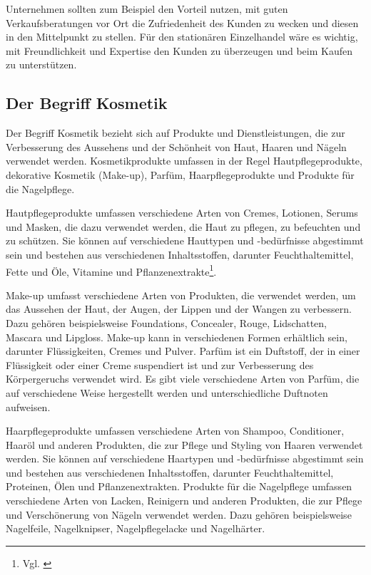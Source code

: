 Unternehmen sollten zum Beispiel den Vorteil nutzen, mit guten Verkaufsberatungen vor Ort die Zufriedenheit des Kunden zu wecken und diesen in den Mittelpunkt zu stellen. Für den stationären Einzelhandel wäre es wichtig, mit Freundlichkeit und Expertise den Kunden zu überzeugen und beim Kaufen zu unterstützen.


\subsection{Der Begriff Kosmetik}\label{unterabschnitt_2_5}
Der Begriff Kosmetik bezieht sich auf Produkte und Dienstleistungen, die zur Verbesserung des Aussehens und der Schönheit von Haut, Haaren und Nägeln verwendet werden. Kosmetikprodukte umfassen in der Regel Hautpflegeprodukte, dekorative Kosmetik (Make-up), Parfüm, Haarpflegeprodukte und Produkte für die Nagelpflege.
\newline

Hautpflegeprodukte umfassen verschiedene Arten von Cremes, Lotionen, Serums und Masken, die dazu verwendet werden, die Haut zu pflegen, zu befeuchten und zu schützen. Sie können auf verschiedene Hauttypen und -bedürfnisse abgestimmt sein und bestehen aus verschiedenen Inhaltsstoffen, darunter Feuchthaltemittel, Fette und Öle, Vitamine und Pflanzenextrakte\footnote{Vgl. \autocite [S. 11] {Umbach2012}}.
\newline

Make-up umfasst verschiedene Arten von Produkten, die verwendet werden, um das Aussehen der Haut, der Augen, der Lippen und der Wangen zu verbessern. Dazu gehören beispielsweise Foundations, Concealer, Rouge, Lidschatten, Mascara und Lipgloss. Make-up kann in verschiedenen Formen erhältlich sein, darunter Flüssigkeiten, Cremes und Pulver.
Parfüm ist ein Duftstoff, der in einer Flüssigkeit oder einer Creme suspendiert ist und zur Verbesserung des Körpergeruchs verwendet wird. Es gibt viele verschiedene Arten von Parfüm, die auf verschiedene Weise hergestellt werden und unterschiedliche Duftnoten aufweisen.
\newline

Haarpflegeprodukte umfassen verschiedene Arten von Shampoo, Conditioner, Haaröl und anderen Produkten, die zur Pflege und Styling von Haaren verwendet werden. Sie können auf verschiedene Haartypen und -bedürfnisse abgestimmt sein und bestehen aus verschiedenen Inhaltsstoffen, darunter Feuchthaltemittel, Proteinen, Ölen und Pflanzenextrakten.
Produkte für die Nagelpflege umfassen verschiedene Arten von Lacken, Reinigern und anderen Produkten, die zur Pflege und Verschönerung von Nägeln verwendet werden. Dazu gehören beispielsweise Nagelfeile, Nagelknipser, Nagelpflegelacke und Nagelhärter.
\newline

